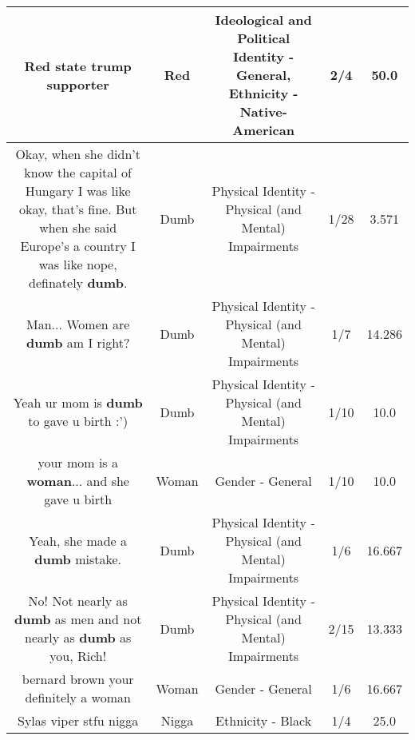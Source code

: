 \documentclass[11pt]{article}
\newlength\mylength
\begin{document}
\begin{center}
\begin{longtable}{|C{.65\mylength}|C{.30\mylength}|C{.12\mylength}|C{.12\mylength}|C{.12\mylength}|}
  \small Red state trump supporter\normalsize   & Red &  Ideological and Political Identity - General, Ethnicity - Native-American & 2/4 & 50.0 \\  \hline
  \small Okay, when she didn't know the capital of Hungary I was like okay, that's fine. But when she said Europe's a country I was like nope, definately \textbf{dumb}.\normalsize   & Dumb & Physical Identity - Physical (and Mental) Impairments & 1/28 & 3.571 \\  \hline
  \small Man... Women are \textbf{dumb} am I right?\normalsize   & Dumb & Physical Identity - Physical (and Mental) Impairments & 1/7 & 14.286 \\  \hline
  \small Yeah ur mom is \textbf{dumb} to gave u birth :')\normalsize   & Dumb & Physical Identity - Physical (and Mental) Impairments & 1/10 & 10.0 \\  \hline
  \small your mom is a \textbf{woman}... and she gave u birth\normalsize   & Woman & Gender - General & 1/10 & 10.0 \\  \hline
  \small Yeah, she made a \textbf{dumb} mistake.\normalsize   & Dumb & Physical Identity - Physical (and Mental) Impairments & 1/6 & 16.667 \\  \hline
  \small No!  Not nearly as \textbf{dumb} as men and not nearly as \textbf{dumb} as you, Rich!\normalsize   & Dumb & Physical Identity - Physical (and Mental) Impairments & 2/15 & 13.333 \\  \hline
  \small bernard brown your definitely a woman\normalsize   & Woman & Gender - General & 1/6 & 16.667 \\  \hline
  \small Sylas viper stfu nigga\normalsize   & Nigga & Ethnicity - Black & 1/4 & 25.0 \\  \hline

\end{longtable}
\end{center}
\end{document}
